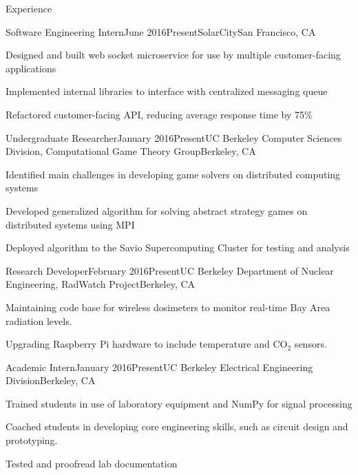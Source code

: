 \documentclass{resume} %
\begin{document}
\begin{rSection}{Experience}
\begin{rSubsection}{Software Engineering Intern}{June 2016\textminus Present}{SolarCity}{San Francisco, CA}
\item[] Designed and built web socket microservice for use by multiple customer-facing applications
\item[] Implemented internal libraries to interface with centralized messaging queue
\item[] Refactored customer-facing API, reducing average response time by 75\%
\end{rSubsection}
\begin{rSubsection}{Undergraduate Researcher}{January 2016\textminus Present}{UC Berkeley Computer Sciences Division, Computational Game Theory Group}{Berkeley, CA}
\item[] Identified main challenges in developing game solvers on distributed computing systems
\item[] Developed generalized algorithm for solving abstract strategy games on distributed systems using MPI
\item[] Deployed algorithm to the Savio Supercomputing Cluster for testing and analysis
\end{rSubsection}
\begin{rSubsection}{Research Developer}{February 2016\textminus Present}{UC Berkeley Department of Nuclear Engineering, RadWatch Project}{Berkeley, CA}
\item[] Maintaining code base for wireless dosimeters to monitor real-time Bay Area radiation levels.
\item[] Upgrading Raspberry Pi hardware to include temperature and CO$_2$ sensors. 
\end{rSubsection}
\begin{rSubsection}{Academic Intern}{January 2016\textminus Present}{UC Berkeley Electrical Engineering Division}{Berkeley, CA}
\item[] Trained students in use of laboratory equipment and NumPy for signal processing
\item[] Coached students in developing core engineering skills, such as circuit design and prototyping.
\item[] Tested and proofread lab documentation
\end{rSubsection}
\end{rSection}

\end{document}
